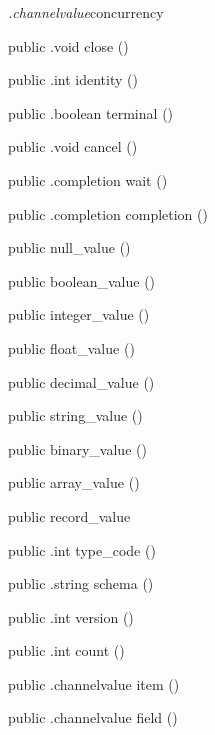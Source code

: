 \begin{CrexxClass}{\textit{.channelvalue}}{concurrency}
\begin{Members}
    \Method
      {public}
      {.void}
      {close}
      {()}

    \Method
      {public}
      {.int}
      {identity}
      {()}

    \Method
      {public}
      {.boolean}
      {terminal}
      {()}

    \Method
      {public}
      {.void}
      {cancel}
      {()}

    \Method
      {public}
      {.completion}
      {wait}
      {()}

    \Method
      {public}
      {.completion}
      {completion}
      {()}

    \Factory
      {public}
      {null\_value}
      {()}

    \Factory
      {public}
      {boolean\_value}
      {()}

    \Factory
      {public}
      {integer\_value}
      {()}

    \Factory
      {public}
      {float\_value}
      {()}

    \Factory
      {public}
      {decimal\_value}
      {()}

    \Factory
      {public}
      {string\_value}
      {()}

    \Factory
      {public}
      {binary\_value}
      {()}

    \Factory
      {public}
      {array\_value}
      {()}

    \Factory
      {public}
      {record\_value}
      {}

    \Method
      {public}
      {.int}
      {type\_code}
      {()}

    \Method
      {public}
      {.string}
      {schema}
      {()}

    \Method
      {public}
      {.int}
      {version}
      {()}

    \Method
      {public}
      {.int}
      {count}
      {()}

    \Method
      {public}
      {.channelvalue}
      {item}
      {()}

    \Method
      {public}
      {.channelvalue}
      {field}
      {()}


\end{Members}
\end{CrexxClass}
